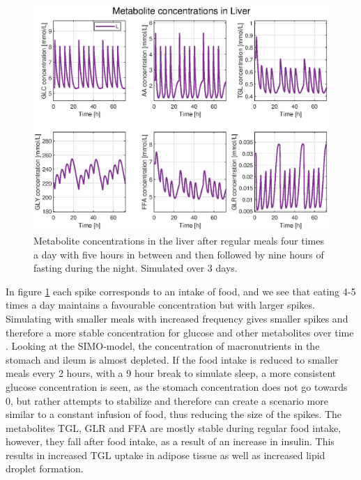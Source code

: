 \documentclass{IEEEtran}
\begin{document}
\begin{figure}[H]
    \includegraphics[trim=50 0 50 0, clip,width=\columnwidth, height=0.3\textheight]
    {Diagrams/Food/liver_plot.eps}
    \caption{Metabolite concentrations in the liver after regular meals four times a day with five hours in between and then followed by nine hours of fasting during the night. Simulated over 3 days.}
    \label{fig:food_plots_bends_cars}
\end{figure}





In figure \ref{fig:food_plots_bends_cars} each spike corresponds to an intake of food, and we see that eating 4-5 times a day maintains a favourable concentration but with larger spikes. Simulating with smaller meals with increased frequency gives smaller spikes and therefore a more stable concentration for glucose and other metabolites over time \cite{derendorf_schmidt_rowland_tozer_2020}. Looking at the SIMO-model, the concentration of macronutrients in the stomach and ileum is almost depleted. If the food intake is reduced to smaller meals every 2 hours, with a 9 hour break to simulate sleep, a more consistent glucose concentration is seen, as the stomach concentration does not go towards 0, but rather attempts to stabilize and therefore can create a scenario more similar to a constant infusion of food, thus reducing the size of the spikes. The metabolites TGL, GLR and FFA are mostly stable during regular food intake, however, they fall after food intake, as a result of an increase in insulin. This results in increased TGL uptake in adipose tissue as well as increased lipid droplet formation.
\end{document}
